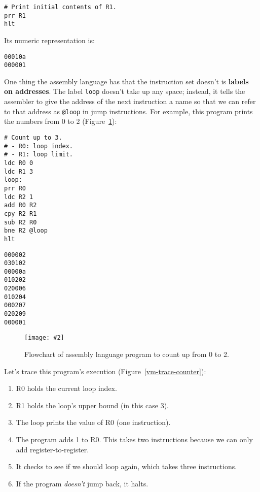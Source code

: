 \documentclass{scrbook}
\newcommand{\figref}[1]{Figure~\ref{#1}}
\newcommand{\figpdf}[4]{\begin{figure}%
\centering%
\texttt{[image: \#2]}%
\caption{#3}%
\label{#1}%
\end{figure}}
\newcommand{\glossref}[1]{\textbf{#1}}
\begin{document}
\begin{lstlisting}[frame=single,frameround=tttt]
# Print initial contents of R1.
prr R1
hlt
\end{lstlisting}



\noindent Its numeric representation is:


\begin{lstlisting}[frame=single,frameround=tttt]
00010a
000001
\end{lstlisting}



One thing the assembly language has that the instruction set doesn't
is \glossref{labels on addresses}.
The label \texttt{loop} doesn't take up any space;
instead,
it tells the assembler to give the address of the next instruction a name
so that we can refer to that address as \texttt{@loop} in jump instructions.
For example,
this program prints the numbers from 0 to 2
(\figref{vm-count_up}):


\begin{lstlisting}[frame=single,frameround=tttt]
# Count up to 3.
# - R0: loop index.
# - R1: loop limit.
ldc R0 0
ldc R1 3
loop:
prr R0
ldc R2 1
add R0 R2
cpy R2 R1
sub R2 R0
bne R2 @loop
hlt
\end{lstlisting}



\begin{lstlisting}[frame=single,frameround=tttt]
000002
030102
00000a
010202
020006
010204
000207
020209
000001
\end{lstlisting}


\figpdf{vm-count_up}{./vm/count_up.pdf}{Flowchart of assembly language program to count up from 0 to 2.}{0.6}


Let's trace this program's execution
(\figref{vm-trace-counter}):

\begin{enumerate}

\item R0 holds the current loop index.

\item R1 holds the loop's upper bound (in this case 3).

\item The loop prints the value of R0 (one instruction).

\item The program adds 1 to R0.
    This takes two instructions because we can only add register-to-register.

\item It checks to see if we should loop again,
    which takes three instructions.

\item If the program \emph{doesn't} jump back, it halts.

\end{enumerate}
\end{document}
